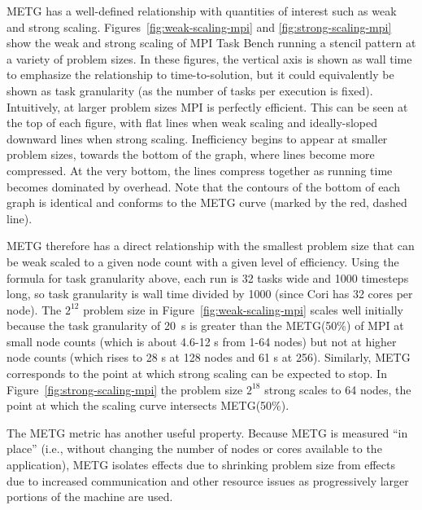 METG has a well-defined
relationship with quantities of interest such as
weak and strong scaling. Figures~\ref{fig:weak-scaling-mpi} and
\ref{fig:strong-scaling-mpi} show the weak and strong scaling of MPI Task Bench running a stencil pattern at a variety of problem sizes. In these
figures, the vertical axis is shown as wall time to emphasize the
relationship to time-to-solution, but it could equivalently be shown
as task granularity (as the number of tasks per execution is
fixed). Intuitively, at
larger problem sizes MPI is perfectly efficient. This can be seen at
the top of each figure, with flat lines when weak scaling and
ideally-sloped downward lines when strong scaling. Inefficiency begins
to appear at smaller problem sizes, towards the bottom of the graph,
where lines become more compressed. At the
very bottom, the lines compress together as running time becomes
dominated by overhead. Note that the contours of the bottom of each
graph is identical and conforms to the METG curve (marked by the red,
dashed line).



METG therefore has a direct relationship with the smallest problem
size that can be weak scaled to a given node count with a given level
of efficiency. Using the formula for task granularity above, each run
is 32 tasks wide and 1000 timesteps long, so task granularity is wall
time divided by 1000 (since Cori has 32 cores per node). The $2^{12}$
problem size in Figure~\ref{fig:weak-scaling-mpi} scales well
initially because the task granularity of 20~\textmu{}s is greater
than the METG(50\%) of MPI at small node counts (which is about 4.6-12
\textmu{}s from 1-64 nodes) but not at higher node counts (which rises
to 28 \textmu{}s at 128 nodes and 61 \textmu{}s at 256). Similarly,
METG corresponds to the point at which strong scaling can be expected
to stop. In Figure~\ref{fig:strong-scaling-mpi} the problem size
$2^{18}$ strong scales to 64 nodes, the point at which the
scaling curve intersects METG(50\%).

The METG metric has another useful property. Because METG is measured ``in place'' (i.e.,
without changing the number of nodes or cores available to the
application), METG isolates effects
due to shrinking problem size from effects due to
increased communication and other resource issues as
progressively larger portions of the machine are used.
